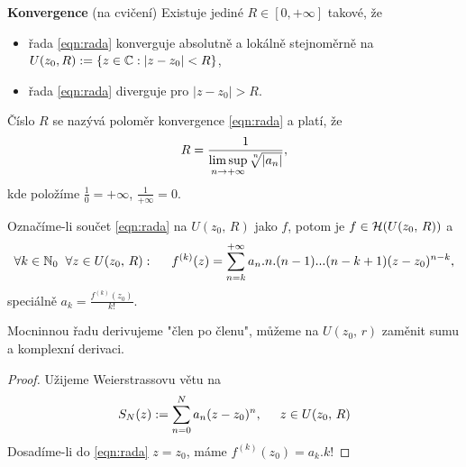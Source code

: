 \begin{properties}
 \textbf{Konvergence} (na cvičení) \newline
Existuje jediné $R\in{[0,+\infty]}$ takové, že 
\begin{itemize}
    \item řada \cref{eqn:rada} konverguje absolutně a lokálně stejnoměrně na  $U(z_0,R):=\{z\in\operatorname{\mathbb{C}}   : |z-z_0|<R\}$, 
    \item řada \cref{eqn:rada} diverguje pro $|z-z_0|>R$. 
\end{itemize}
Číslo $R$ se nazývá poloměr konvergence \cref{eqn:rada} a platí, že
\[R=\frac{1}{
\underset{n\to+\infty}{\limsup}{\sqrt[\leftroot{-3}\uproot{3}n]{|a_n|}}},\]
kde položíme $\frac{1}{0}=+\infty$, $\frac{1}{+\infty}=0$.

 Označíme-li součet \cref{eqn:rada} na $U(z_0,\, R)$ jako $f$, potom je $f\in\operatorname{\mathcal{H}} (U(z_0,\, R))$ a 
\[
\forall{k\in\operatorname{\mathbb{N}}_0}\hspace{2mm}\forall{z\in{U(z_0,\,R)}}: \hspace{5mm}
f^{(k)}(z)=
\sum_{n=k}^{+\infty}{a_n.n.(n-1)...(n-k+1)(z-z_0)^{n-k}},\]
speciálně $a_k=\frac{f^{(k)}(z_0)}{k!}$.
\end{properties}

\begin{note}
Mocninnou řadu derivujeme "člen po členu", můžeme na $U(z_0,\,r)$ zaměnit sumu a komplexní derivaci.
\end{note}

\begin{proof}
Užijeme Weierstrassovu větu na 
\[S_N(z):=\sum_{n=0}^N{a_n(z-z_0)^n},\hspace{5mm} z\in{U(z_0,\,R)}\]
Dosadíme-li do \cref{eqn:rada} $z=z_0$, máme $f^{(k)}(z_0)={a_k}.{k!}$
\end{proof}